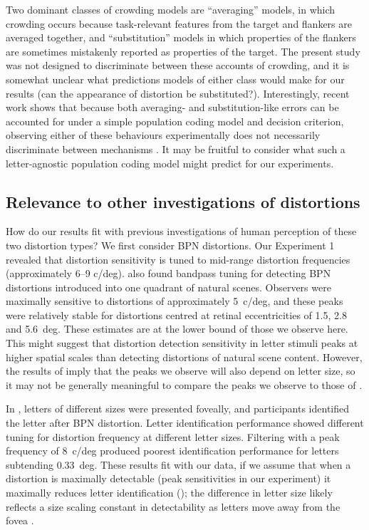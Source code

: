 \documentclass[doc, 11pt,a4paper,natbib]{apa6}\usepackage[]{graphicx}\usepackage[]{color}
\begin{document}
Two dominant classes of crowding models are ``averaging'' models, in which crowding occurs because task-relevant features from the target and flankers are averaged together, and ``substitution'' models in which properties of the flankers are sometimes mistakenly reported as properties of the target.
The present study was not designed to discriminate between these accounts of crowding, and it is somewhat unclear what predictions models of either class would make for our results (can the appearance of distortion be substituted?).
Interestingly, recent work shows that because both averaging- and substitution-like errors can be accounted for under a simple population coding model and decision criterion, observing either of these behaviours experimentally does not necessarily discriminate between mechanisms \citep[at least for orientation discrimination; ][]{harrison_unifying_2015}.
It may be fruitful to consider what such a letter-agnostic population coding model might predict for our experiments.

\subsection{Relevance to other investigations of distortions}

How do our results fit with previous investigations of human perception of these two distortion types?
We first consider BPN distortions.
Our Experiment 1 revealed that distortion sensitivity is tuned to mid-range distortion frequencies (approximately 6--9 c/deg).
\citet{bex_sensitivity_2010} also found bandpass tuning for detecting BPN distortions introduced into one quadrant of natural scenes.
Observers were maximally sensitive to distortions of approximately 5~c/deg, and these peaks were relatively stable for distortions centred at retinal eccentricities of 1.5, 2.8 and 5.6~deg.
These estimates are at the lower bound of those we observe here.
This might suggest that distortion detection sensitivity in letter stimuli peaks at higher spatial scales than detecting distortions of natural scene content.
However, the results of \citet{wiecek_metamorphopsia_2014} imply that the peaks we observe will also depend on letter size, so it may not be generally meaningful to compare the peaks we observe to those of \citet{bex_sensitivity_2010}.

In \citet{wiecek_metamorphopsia_2014}, letters of different sizes were presented foveally, and participants identified the letter after BPN distortion.
Letter identification performance showed different tuning for distortion frequency at different letter sizes.
Filtering with a peak frequency of 8~c/deg produced poorest identification performance for letters subtending 0.33~deg.
These results fit with our data, if we assume that when a distortion is maximally detectable (peak sensitivities in our experiment) it maximally reduces letter identification (\citet{wiecek_metamorphopsia_2014}); the difference in letter size likely reflects a size scaling constant in detectability as letters move away from the fovea \citep{chung_spatialfrequency_2002, song_double_2014}.
\end{document}

